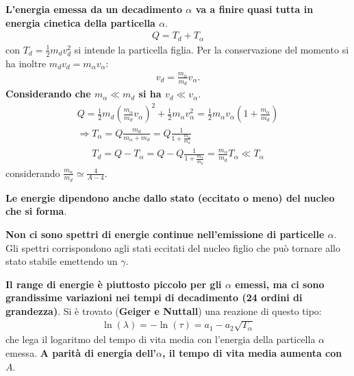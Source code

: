 \documentclass[a4paper,11pt,twoside,openany]{book}
\theoremstyle{definition}
\theoremstyle{plain}
\theoremstyle{plain}
\theoremstyle{definition}
\begin{document}
\textbf{L'energia emessa da un decadimento $\alpha$ va a finire quasi tutta in energia cinetica della particella $\alpha$}.
\begin{equation}\begin{split}
Q=T_d+T_{\alpha}
\end{split}\end{equation}
con $T_d=\frac{1}{2}m_dv^2_d$ si intende la particella figlia. Per la conservazione del momento si ha inoltre $m_dv_d=m_{\alpha}v_{\alpha}$:
\begin{equation}\begin{split}
v_d=\frac{m_{\alpha}}{m_d}v_{\alpha}.
\end{split}\end{equation}
\textbf{Considerando che $m_{\alpha}\ll m_d$ si ha $v_d\ll v_{\alpha}$}.
\begin{equation}\begin{split}
Q=\frac{1}{2}m_d\left(\frac{m_{\alpha}}{m_d}v_{\alpha}\right)^2+\frac{1}{2}m_{\alpha}v^2_{\alpha}=\frac{1}{2}m_{\alpha}v_{\alpha}\left(1+\frac{m_{\alpha}}{m_d}\right)\\
\Longrightarrow T_{\alpha}=Q\frac{m_d}{m_{\alpha}+m_d}=Q\frac{1}{1+\frac{m_{\alpha}}{m_d}}
\end{split}\end{equation}
\begin{equation}\begin{split}
T_d=Q-T_{\alpha}=Q-Q\frac{1}{1+\frac{m_{\alpha}}{m_d}}=\frac{m_{\alpha}}{m_d}T_{\alpha}\ll T_{\alpha}
\end{split}\end{equation}
considerando $\frac{m_{\alpha}}{m_d}\simeq \frac{4}{A-4}$.

\textbf{Le energie dipendono anche dallo stato (eccitato o meno) del nucleo che si forma}.

\textbf{Non ci sono spettri di energie continue nell'emissione di particelle $\alpha$}. Gli spettri corrispondono agli stati eccitati del nucleo figlio che può tornare allo stato stabile emettendo un $\gamma$.

\textbf{Il range di energie è piuttosto piccolo per gli $\alpha$ emessi, ma ci sono grandissime variazioni nei tempi di decadimento (24 ordini di grandezza)}. Si è trovato (\textbf{Geiger e Nuttall}) una reazione di questo tipo:
\begin{equation}\begin{split}
\ln{\left(\lambda\right)}=-\ln{\left(\tau\right)}=a_1-a_2\sqrt{T_{\alpha}}
\end{split}\end{equation}
che lega il logaritmo del tempo di vita media con l'energia della particella $\alpha$ emessa. \textbf{A parità di energia dell'$\alpha$, il tempo di vita media aumenta con $A$}.
\end{document}
